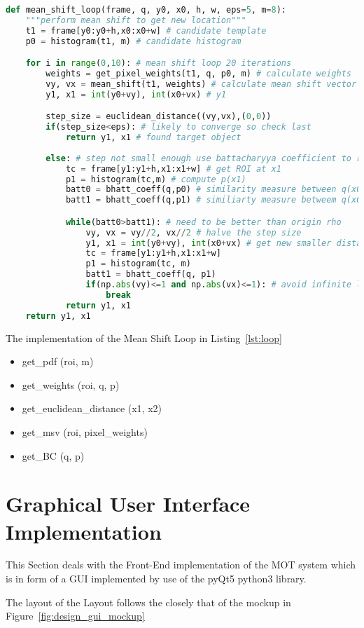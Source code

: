 \begin{lstlisting}[language=Python, caption={Mean Shift Loop}, captionpos=b, label={lst:loop}]
def mean_shift_loop(frame, q, y0, x0, h, w, eps=5, m=8):
    """perform mean shift to get new location"""
    t1 = frame[y0:y0+h,x0:x0+w] # candidate template
    p0 = histogram(t1, m) # candidate histogram

    for i in range(0,10): # mean shift loop 20 iterations
        weights = get_pixel_weights(t1, q, p0, m) # calculate weights
        vy, vx = mean_shift(t1, weights) # calculate mean shift vector
        y1, x1 = int(y0+vy), int(x0+vx) # y1

        step_size = euclidean_distance((vy,vx),(0,0))
        if(step_size<eps): # likely to converge so check last
            return y1, x1 # found target object
            
        else: # step not small enough use battacharyya coefficient to refine step
            tc = frame[y1:y1+h,x1:x1+w] # get ROI at x1
            p1 = histogram(tc,m) # compute p(x1)
            batt0 = bhatt_coeff(q,p0) # similarity measure between q(x0) and p(x0) 
            batt1 = bhatt_coeff(q,p1) # similiarty measure betweem q(x0) and p(x1)

            while(batt0>batt1): # need to be better than origin rho
                vy, vx = vy//2, vx//2 # halve the step size
                y1, x1 = int(y0+vy), int(x0+vx) # get new smaller distance 
                tc = frame[y1:y1+h,x1:x1+w]
                p1 = histogram(tc, m)
                batt1 = bhatt_coeff(q, p1)
                if(np.abs(vy)<=1 and np.abs(vx)<=1): # avoid infinite loop
                    break
            return y1, x1
    return y1, x1
\end{lstlisting}

The implementation of the Mean Shift Loop in Listing~\ref{lst:loop} 
\begin{itemize}
    \item get\_pdf (roi, m)
    \item get\_weights (roi, q, p)
    \item get\_euclidean\_distance (x1, x2)
    \item get\_msv (roi, pixel\_weights)
    \item get\_BC (q, p)
\end{itemize}


\section{Graphical User Interface Implementation}
This Section deals with the Front-End implementation of the MOT system which is
in form of a GUI implemented by use of the pyQt5 python3 library.

The layout of the Layout follows the closely that of the mockup in
Figure~\ref{fig:design_gui_mockup}



